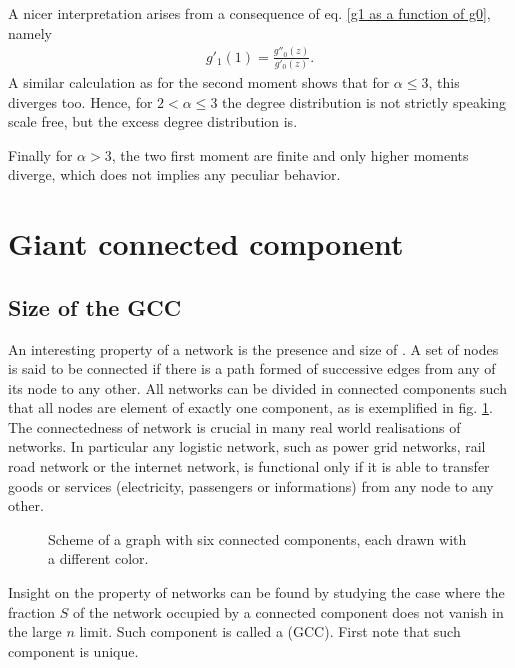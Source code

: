 \documentclass[
11pt, %
english, %
singlespacing, %
nolistspacing, %
liststotoc, %
headsepline, %
]{MastersDoctoralThesis} %
\begin{document}
A nicer interpretation arises from a consequence of eq. \eqref{g1 as a function of g0}, namely
\begin{align}
	g'_1(1) = \frac{g''_0(z)}{g'_0(z)}.
\end{align}
A similar calculation as for the second moment shows that for $\alpha \leq 3$, this diverges too. Hence, for $2 < \alpha \leq 3$ the degree distribution is not strictly speaking scale free, but the excess degree distribution is.

Finally for $\alpha > 3$, the two first moment are finite and only higher moments diverge, which does not implies any peculiar behavior.

\section{Giant connected component}
\label{Section: Giant connected component}

\subsection{Size of the GCC}

An interesting property of a network is the presence and size of . A set of nodes is said to be connected if there is a path formed of successive edges from any of its node to any other. All networks can be divided in connected components such that all nodes are element of exactly one component, as is exemplified in fig. \ref{Figure: Connected components}. The connectedness of network is crucial in many real world realisations of networks. In particular any logistic network, such as power grid networks, rail road network or the internet network, is functional only if it is able to transfer goods or services (electricity, passengers or informations) from any node to any other.

\begin{figure}
	
	\caption{Scheme of a graph with six connected components, each drawn with a different color.}
	\label{Figure: Connected components}
\end{figure}

Insight on the property of networks can be found by studying the case where the fraction $S$ of the network occupied by a connected component does not vanish in the large $n$ limit. Such component is called a  (GCC). First note that such component is unique.
\end{document}
